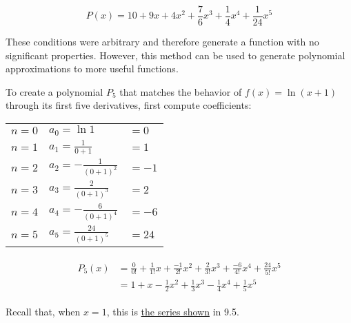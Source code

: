 \documentclass[10pt]{article}
\theoremstyle{definition}
\begin{document}
\[P(x)=10+9x+4x^2+\frac{7}{6}x^3+\frac{1}{4}x^4+\frac{1}{24}x^5\]

These conditions were arbitrary and therefore generate a function with no significant properties. However, this method can be used to generate polynomial approximations to more useful functions.

\newpage

To create a polynomial $P_5$ that matches the behavior of $f(x)=\ln (x+1)$ through its first five derivatives, first compute coefficients:

\renewcommand{\arraystretch}{1.2}

\begin{center}
\begin{tabular}{l l l}
$n=0$    &$a_0=\ln 1$ & $= 0$ \\
$n=1$    &$a_1=\frac{1}{0+1}$ & $=1$ \\
$n=2$    &$a_2=-\frac{1}{(0+1)^2}$ & $= -1$ \\
$n=3$    &$a_3=\frac{2}{(0+1)^3}$ & $= 2$ \\
$n=4$    &$a_4=-\frac{6}{(0+1)^4}$ & $= -6$ \\
$n=5$    &$a_5=\frac{24}{(0+1)^5}$ & $= 24$ \\
\end{tabular}
\end{center}

\begin{align*}
\begin{split}
    P_5(x)&=\frac{0}{0!}+\frac{1}{1!}x+\frac{-1}{2!}x^2+\frac{2}{3!}x^3+\frac{-6}{4!}x^4+\frac{24}{5!}x^5 \\
    &= 1+x-\frac{1}{2}x^2+\frac{1}{3}x^3-\frac{1}{4}x^4+\frac{1}{5}x^5
\end{split}
\end{align*}

Recall that, when $x=1$, this is \hyperlink{ln2}{the series shown} in 9.5.
\end{document}
